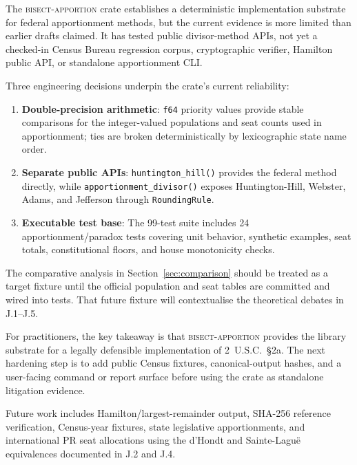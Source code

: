 The \textsc{bisect-apportion} crate establishes a deterministic implementation
substrate for federal apportionment methods, but the current evidence is more
limited than earlier drafts claimed.  It has tested public divisor-method APIs,
not yet a checked-in Census Bureau regression corpus, cryptographic verifier,
Hamilton public API, or standalone apportionment CLI.

Three engineering decisions underpin the crate's current reliability:
\begin{enumerate}
  \item \textbf{Double-precision arithmetic}: \texttt{f64} priority values
    provide stable comparisons for the integer-valued populations and seat
    counts used in apportionment; ties are broken deterministically by
    lexicographic state name order.
  \item \textbf{Separate public APIs}: \texttt{huntington\_hill()} provides the
    federal method directly, while \texttt{apportionment\_divisor()} exposes
    Huntington-Hill, Webster, Adams, and Jefferson through \texttt{RoundingRule}.
  \item \textbf{Executable test base}: The 99-test suite includes 24
    apportionment/paradox tests covering unit behavior, synthetic examples, seat
    totals, constitutional floors, and house monotonicity checks.
\end{enumerate}

The comparative analysis in Section~\ref{sec:comparison} should be treated as a
target fixture until the official population and seat tables are committed and
wired into tests.  That future fixture will contextualise the theoretical
debates in J.1--J.5.

For practitioners, the key takeaway is that \textsc{bisect-apportion} provides
the library substrate for a legally defensible implementation of 2~U.S.C.\
\S2a.  The next hardening step is to add public Census fixtures, canonical-output
hashes, and a user-facing command or report surface before using the crate as
standalone litigation evidence.

Future work includes Hamilton/largest-remainder output, SHA-256 reference
verification, Census-year fixtures, state legislative apportionments, and
international PR seat allocations using the d'Hondt and Sainte-Lagu\"{e}
equivalences documented in J.2 and J.4.
